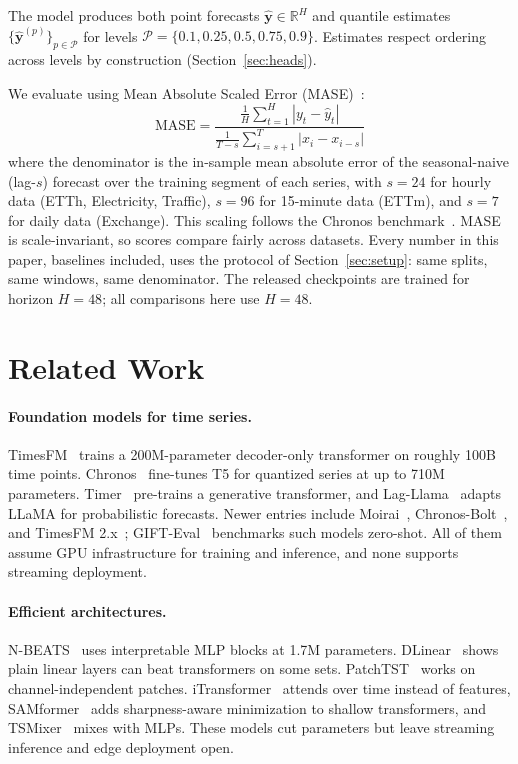 \documentclass[11pt]{article}
\begin{document}
The model produces both point forecasts $\hat{\mathbf{y}} \in \mathbb{R}^H$ and quantile estimates $\{\hat{\mathbf{y}}^{(p)}\}_{p \in \mathcal{P}}$ for levels $\mathcal{P} = \{0.1, 0.25, 0.5, 0.75, 0.9\}$. Estimates respect ordering across levels by construction (Section~\ref{sec:heads}).

We evaluate using Mean Absolute Scaled Error (MASE)~\cite{mase}:
\begin{equation}
\text{MASE} = \frac{\frac{1}{H} \sum_{t=1}^{H} |y_t - \hat{y}_t|}{\frac{1}{T-s} \sum_{i=s+1}^{T} |x_i - x_{i-s}|}
\label{eq:mase}
\end{equation}
where the denominator is the in-sample mean absolute error of the seasonal-naive (lag-$s$) forecast over the training segment of each series, with $s=24$ for hourly data (ETTh, Electricity, Traffic), $s=96$ for 15-minute data (ETTm), and $s=7$ for daily data (Exchange). This scaling follows the Chronos benchmark~\cite{chronos}. MASE is scale-invariant, so scores compare fairly across datasets. Every number in this paper, baselines included, uses the protocol of Section~\ref{sec:setup}: same splits, same windows, same denominator. The released checkpoints are trained for horizon $H=48$; all comparisons here use $H=48$.

\section{Related Work}
\label{sec:related}

\paragraph{Foundation models for time series.}
TimesFM~\cite{timesfm} trains a 200M-parameter decoder-only transformer on roughly 100B time points. Chronos~\cite{chronos} fine-tunes T5 for quantized series at up to 710M parameters. Timer~\cite{timer} pre-trains a generative transformer, and Lag-Llama~\cite{lagllama} adapts LLaMA for probabilistic forecasts. Newer entries include Moirai~\cite{moirai}, Chronos-Bolt~\cite{chronosbolt}, and TimesFM 2.x~\cite{timesfm2}; GIFT-Eval~\cite{gifteval} benchmarks such models zero-shot. All of them assume GPU infrastructure for training and inference, and none supports streaming deployment.

\paragraph{Efficient architectures.}
N-BEATS~\cite{nbeats} uses interpretable MLP blocks at 1.7M parameters. DLinear~\cite{dlinear} shows plain linear layers can beat transformers on some sets. PatchTST~\cite{patchtst} works on channel-independent patches. iTransformer~\cite{itransformer} attends over time instead of features, SAMformer~\cite{samformer} adds sharpness-aware minimization to shallow transformers, and TSMixer~\cite{tsmixer} mixes with MLPs. These models cut parameters but leave streaming inference and edge deployment open.
\end{document}
